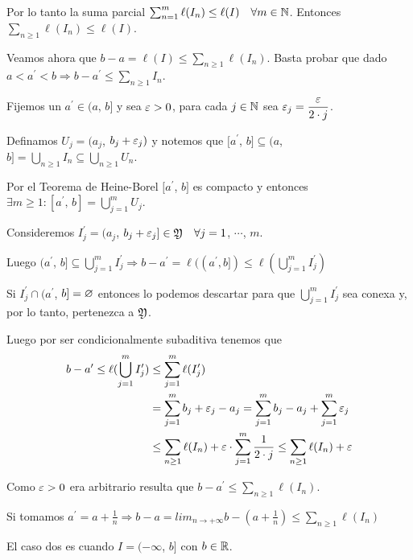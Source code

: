 Por lo tanto la suma parcial $\sum_{n = 1}^m \ell(I_n) \leq \ell(I) \quad \forall m \in \mathbb{N}$.
Entonces $\sum_{n \geq 1} \ell(I_n) \leq \ell(I)$.

Veamos ahora que $b-a = \ell(I) \leq \sum_{n \geq 1} \ell(I_n)$.
Basta probar que dado $a < a^{\prime} < b \Rightarrow b - a^{\prime} \leq \sum_{n \geq 1} I_n$.

Fijemos un $a^{\prime} \in (a\text{, } b]$ y sea $\varepsilon > 0$, para cada $j \in \mathbb{N}$ sea $\varepsilon_j = \dfrac{\varepsilon}{2 \cdot j}$.

Definamos $U_j = (a_j$, $b_j + \varepsilon_j)$ y notemos que $[a^\prime$, $b] \subseteq (a$, $b] = \bigcup_{n \geq 1} I_n \subseteq \bigcup_{n \geq 1} U_n$.

Por el Teorema de Heine-Borel $[a^\prime$, $b]$ es compacto y entonces $\exists m \geq 1 : [a^\prime \text{, } b] = \bigcup_{j = 1}^m U_j$.

Consideremos $I^\prime_j = (a_j$, $b_j + \varepsilon_j] \in \mathfrak{Y} \quad \forall j = 1$, $\cdots$, $m$.

Luego $(a^\prime$, $b] \subseteq \bigcup_{j = 1}^m I^\prime_j \Rightarrow b - a^\prime = \ell((a^\prime, b]) \leq \ell(\bigcup_{j = 1}^m I^\prime_j)$

Si $I^\prime_j \cap (a^\prime$, $b] = \varnothing$ entonces lo podemos descartar para que $\bigcup_{j = 1}^m I^\prime_j$ sea conexa y, por lo tanto, pertenezca a $\mathfrak{Y}$.

Luego por ser condicionalmente subaditiva tenemos que \begin{align*}
    b - a^\prime \leq \ell(\bigcup_{j = 1}^m I^\prime_j) & \leq \sum_{j = 1}^m \ell(I^\prime_j)                                                                              \\
                                                         & = \sum_{j = 1}^m b_j + \varepsilon_j - a_j = \sum_{j = 1}^m b_j - a_j + \sum_{j = 1}^m \varepsilon_j                                \\
                                                         & \leq \sum_{n \geq 1} \ell(I_n) + \varepsilon \cdot \sum_{j = 1}^m \dfrac{1}{2 \cdot j} \leq \sum_{n \geq 1} \ell(I_n) + \varepsilon \\
\end{align*}

Como $\varepsilon > 0$ era arbitrario resulta que $b - a^\prime \leq \sum_{n \geq 1} \ell(I_n)$.

Si tomamos $a^\prime = a + \frac{1}{n} \Rightarrow b-a = lim_{n \to +\infty} b - (a + \frac{1}{n}) \leq \sum_{n \geq 1} \ell(I_n)$

El caso dos es cuando $I = (-\infty$, $b]$ con $b \in \mathbb{R}$.

